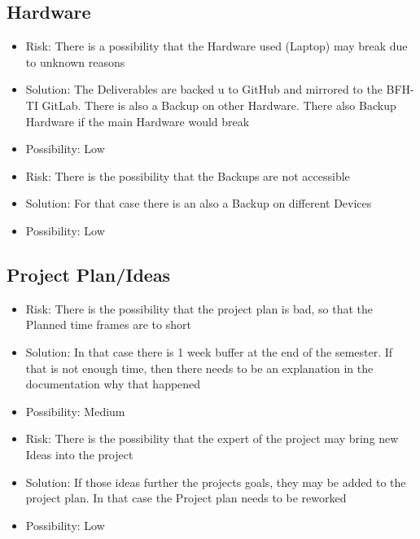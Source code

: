 \documentclass[
	a4paper               %
	,bibliography=totoc   %
	,listof=totoc         %
	,monolingual
	twoside=false,
]{bfhthesis}              %
\begin{document}
\subsection{Hardware}
\begin{itemize}
	\item Risk: There is a possibility that the Hardware used (Laptop) may break due to unknown reasons
	\item Solution: The Deliverables are backed u to GitHub and mirrored to the BFH-TI GitLab. There is also a Backup on other Hardware. There also Backup Hardware if the main Hardware would break
	\item Possibility: Low
\end{itemize}
\begin{itemize}
	\item Risk: There is the possibility that the Backups are not accessible
	\item Solution: For that case there is an also a Backup on different Devices
	\item Possibility: Low
\end{itemize}

\subsection{Project Plan/Ideas}
\begin{itemize}
	\item Risk: There is the possibility that the project plan is bad, so that the Planned time frames are to short
	\item Solution: In that case there is 1 week buffer at the end of the semester. If that is not enough time, then there needs to be an explanation in the documentation why that happened
	\item Possibility: Medium
\end{itemize}
\begin{itemize}
	\item Risk: There is the possibility that the expert of the project may bring new Ideas into the project
	\item Solution: If those ideas further the projects goals, they may be added to the project plan. In that case the Project plan needs to be reworked
	\item Possibility: Low
\end{itemize}

\end{document}
